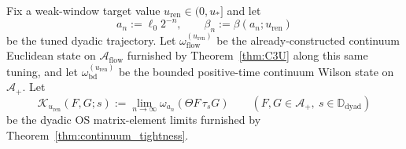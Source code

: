 \begin{theorem}\label{thm:LaneA_closure}
Fix a weak-window target value $u_{\mathrm{ren}}\in(0,u_\ast]$ and let
\[
a_n:=\ell_0 2^{-n},\qquad \beta_n:=\beta(a_n;u_{\mathrm{ren}})
\]
be the tuned dyadic trajectory.
Let $\omega_{\mathrm{flow}}^{(u_{\mathrm{ren}})}$ be the already-constructed continuum Euclidean state on $\mathcal A_{\mathrm{flow}}$ furnished by Theorem~\ref{thm:C3U} along this same tuning, and let
$\omega_{\mathrm{bd}}^{(u_{\mathrm{ren}})}$ be the bounded positive-time continuum Wilson state on $\mathcal A_+$.
Let
\[
\mathcal K_{u_{\mathrm{ren}}}(F,G;s):=\lim_{n\to\infty}\omega_{a_n}(\Theta F\,\tau_s G)
\qquad(F,G\in\mathcal A_+,\ s\in\mathbb D_{\mathrm{dyad}})
\]
be the dyadic OS matrix-element limits furnished by Theorem~\ref{thm:continuum_tightness}.


\end{theorem}
